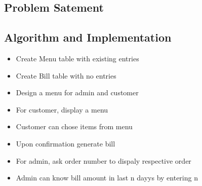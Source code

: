 \documentclass[12pt]{article}
\begin{document}
  \subsection{Problem Satement}
  
  \subsection{Algorithm and Implementation}
  \begin{itemize}
  \item Create Menu table with existing entries
  \item Create Bill table with no entries
  \item Design a menu for admin and customer
  \item For customer, display a menu
  \item Customer can chose items from menu
  \item Upon confirmation generate bill
  \item For admin, ask order number to dispaly respective order
  \item Admin can know bill amount in last n dayys by entering n
  \end{itemize}
  
\end{document}
